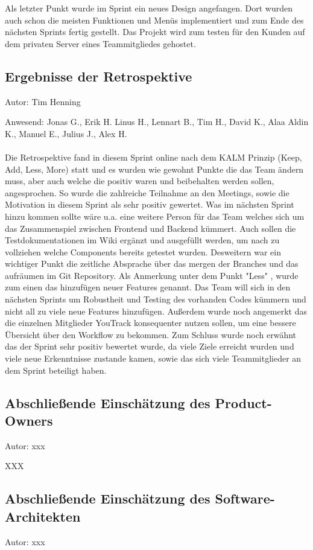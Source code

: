 Als letzter Punkt wurde im Sprint ein neues Design angefangen. Dort wurden auch schon die meisten Funktionen und Menüs implementiert und zum Ende des nächsten Sprints fertig gestellt. Das Projekt wird zum testen für den Kunden auf dem privaten Server eines Teammitgliedes gehostet.


\subsection{Ergebnisse der Retrospektive}
{\small Autor: Tim Henning}

Anwesend: Jonas G., Erik H. Linus H., Lennart B., Tim H., David K., Alaa Aldin K., Manuel E., Julius J., Alex H.\\
\\

Die Retrospektive fand in diesem Sprint online nach dem KALM Prinzip (Keep, Add, Less, More) statt und es wurden wie gewohnt Punkte die das Team ändern muss, aber auch welche die positiv waren und beibehalten werden sollen, angesprochen. So wurde die zahlreiche Teilnahme an den Meetings, sowie die Motivation in diesem Sprint als sehr positiv gewertet. Was im nächsten Sprint hinzu kommen sollte wäre u.a. eine weitere Person für das Team welches sich um das Zusammenspiel zwischen Frontend und Backend kümmert. Auch sollen die Testdokumentationen im Wiki ergänzt und ausgefüllt werden, um nach zu vollziehen welche Components bereits getestet wurden. Desweitern war ein wichtiger Punkt die zeitliche Absprache über das mergen der Branches und das aufräumen im Git Repository. Als Anmerkung unter dem Punkt "Less" , wurde zum einen das hinzufügen neuer Features genannt. Das Team will sich in den nächsten Sprints um Robustheit und Testing des vorhanden Codes kümmern und nicht all zu viele neue Features hinzufügen. Außerdem wurde noch angemerkt das die einzelnen Mitglieder YouTrack konsequenter nutzen sollen, um eine bessere Übersicht über den Workflow zu bekommen. Zum Schluss wurde noch erwähnt das der Sprint sehr positiv bewertet wurde, da viele Ziele erreicht wurden und viele neue Erkenntnisse zustande kamen, sowie das sich viele Teammitglieder an dem Sprint beteiligt haben.

\subsection{Abschließende Einschätzung des Product-Owners}
{\small Autor: xxx}

XXX

\subsection{Abschließende Einschätzung des Software-Architekten}
{\small Autor: xxx}

